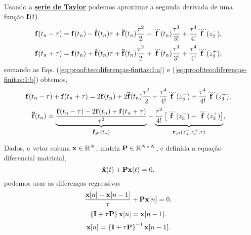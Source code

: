 \begin{myproofT}\label{proof:teo:diferenças-finitas:2}
Usando a \hyperref[def:taylor]{\textbf{serie de Taylor}} podemos aproximar 
a segunda derivada de uma função $\VECTOR{f}(t)$.
\begin{equation}\label{eq:proof:teo:diferenças-finitas:1:a}
\VECTOR{f}(t_n-\ToS) = 
\VECTOR{f}(t_n)-\DTVECTOR{f}(t_n)\ToS +\DDTVECTOR{f}(t_n) \frac{\ToS^2}{2}-\DDDTVECTOR{f}(t_n) \frac{\ToS^3}{3!} +\frac{\ToS^4}{4!}\DDDDTVECTOR{f}(z_{3}^{-}),
\end{equation}
\begin{equation}\label{eq:proof:teo:diferenças-finitas:1:b}
\VECTOR{f}(t_n+\ToS) = 
\VECTOR{f}(t_n)+\DTVECTOR{f}(t_n)\ToS +\DDTVECTOR{f}(t_n) \frac{\ToS^2}{2}+\DDDTVECTOR{f}(t_n) \frac{\ToS^3}{3!} +\frac{\ToS^4}{4!}\DDDDTVECTOR{f}(z_{3}^{+}),
\end{equation}
somando as Eqs. (\ref{eq:proof:teo:diferenças-finitas:1:a}) e (\ref{eq:proof:teo:diferenças-finitas:1:b}) obtemos,
\begin{equation}
\VECTOR{f}(t_n-\ToS) + \VECTOR{f}(t_n+\ToS) = 2 \VECTOR{f}(t_n)+2\DDTVECTOR{f}(t_n) \frac{\ToS^2}{2}+\frac{\ToS^4}{4!}\DDDDTVECTOR{f}(z_{3}^{-}) +\frac{\ToS^4}{4!}\DDDDTVECTOR{f}(z_{3}^{+}),
\end{equation}
\begin{equation}
 \DDTVECTOR{f}(t_n) =
\underbrace{\frac{\VECTOR{f}(t_n-\ToS) -2 \VECTOR{f}(t_n) + \VECTOR{f}(t_n+\ToS)}{\ToS^2}}_{\DTVECTOR{f}_{2^{0}}(t_n)}
-\underbrace{\frac{\ToS^2}{4!}\left[\DDDDTVECTOR{f}(z_{3}^{-}) +\DDDDTVECTOR{f}(z_{3}^{+})\right]}_{\VECTOR{R}_{2^{0}}(z_{3}^{-},z_{3}^{+},\ToS)} ,
\end{equation}
\end{myproofT}



\begin{myproofT}\label{proof:theo:differential-eq-discreto:order1:0}
Dados, o vetor coluna $\VECTOR{x} \in \mathbb{R}^N$, matriz $\MATRIX{P} \in \mathbb{R}^{N\times N}$, 
e definida a equação diferencial matricial,
\begin{equation}\label{eq:theo:firstorder:1}
\DTVECTOR{x}(t) + \MATRIX{P} \VECTOR{x}(t)=0.
\end{equation}
podemos usar as diferenças regressivas
\begin{equation}
\frac{\VECTOR{x}[n]-\VECTOR{x}[n-1]}{\ToS} + \MATRIX{P} \VECTOR{x}[n]=0.
\end{equation}
\begin{equation}
\left\{\MATRIX{I}  + \ToS \MATRIX{P}\right\} \VECTOR{x}[n]=\VECTOR{x}[n-1].
\end{equation}
\begin{equation}
\VECTOR{x}[n]=\left\{\MATRIX{I}  + \ToS \MATRIX{P}\right\}^{-1}\VECTOR{x}[n-1].
\end{equation}
\end{myproofT}

